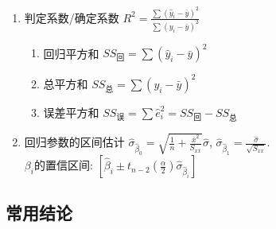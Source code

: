 \begin{enumerate}
\item 判定系数/确定系数 $R^2=\frac{\sum(\hat y_i-\bar y)^2}{\sum(y_i-\bar y)^2}$
\begin{enumerate}
\item 回归平方和 $SS_{\text{回}}=\sum(\hat y_i-\bar y)^2$
\item 总平方和 $SS_{\text{总}}=\sum(y_i-\bar y)^2$
\item 误差平方和 $SS_{\text{误}}=\sum\hat e^2_i=SS_{\text{回}}-SS_{\text{总}}$
\end{enumerate}

\item 回归参数的区间估计
$\hat\sigma_{\hat\beta_0}=\sqrt{\frac{1}{n}+\frac{\bar x^2}{S_{xx}}}\hat\sigma$,
$\hat\sigma_{\hat\beta_1}=\frac{\hat\sigma}{\sqrt{S_{xx}}}$.\\
$\beta_i$的置信区间: $[\hat\beta_i\pm t_{n-2}(\frac{\alpha}{2})\hat\sigma_{\hat\beta_i}]$

\end{enumerate}

\subsection*{常用结论}


